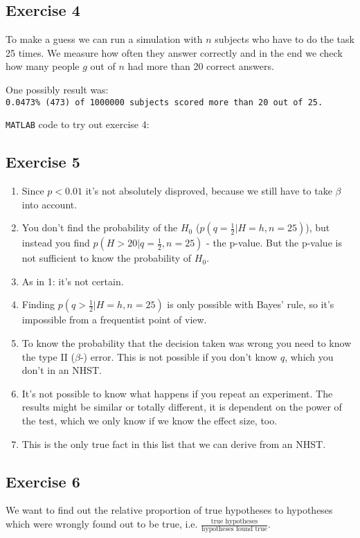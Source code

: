 \documentclass[../main/Notes.tex]{subfiles}
\begin{document}
\subsection*{Exercise 4}
To make a guess we can run a simulation with $n$ subjects who have to do the task 25 times. We measure how often they answer correctly and in the end we check how many people $g$ out of $n$ had more than 20 correct answers.

One possibly result was: \\
\texttt{0.0473\% (473) of 1000000 subjects scored more than 20 out of 25.}

\bigskip

\texttt{MATLAB} code to try out exercise 4:


\subsection*{Exercise 5}
\begin{enumerate}
	\item Since $p < 0.01$ it's not absolutely disproved, because we still have to take $\beta$ into account.
  \item You don't find the probability of the $H_0$ ($p(q=\frac{1}{2}|H=h,n=25)$), but instead you find $p(H>20|q=\frac{1}{2},n=25)$ - the p-value. But the p-value is not sufficient to know the probability of $H_0$.
  \item As in 1: it's not certain.
  \item Finding $p(q>\frac{1}{2}|H=h,n=25)$ is only possible with Bayes' rule, so it's impossible from a frequentist point of view.
  \item To know the probability that the decision taken was wrong you need to know the type II ($\beta$-) error. This is not possible if you don't know $q$, which you don't in an NHST.
  \item It's not possible to know what happens if you repeat an experiment. The results might be similar or totally different, it is dependent on the power of the test, which we only know if we know the effect size, too.
  \item This is the only true fact in this list that we can derive from an NHST. %
\end{enumerate}


\subsection*{Exercise 6}
We want to find out the relative proportion of true hypotheses to hypotheses which were wrongly found out to be true, i.e. $\frac{\text{true hypotheses}}{\text{hypotheses found true}}$.
\end{document}
